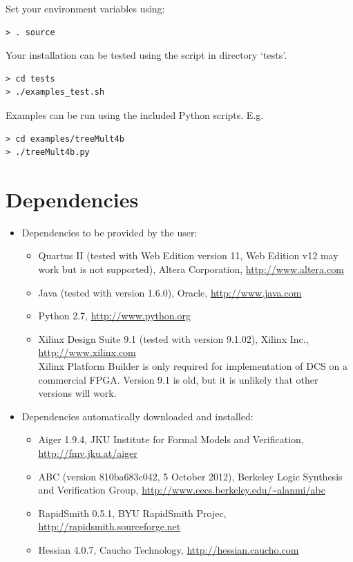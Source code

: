 \documentclass[a4paper,oneside]{memoir}
\begin{document}
Set your environment variables using:
\begin{lstlisting}
> . source
\end{lstlisting}

Your installation can be tested using the script in directory `tests'.
\begin{lstlisting}
> cd tests
> ./examples_test.sh
\end{lstlisting}

Examples can be run using the included Python scripts.
E.g.
\begin{lstlisting}
> cd examples/treeMult4b
> ./treeMult4b.py
\end{lstlisting}

\section{Dependencies}
\begin{itemize}
\item Dependencies to be provided by the user:
\begin{itemize}
\item Quartus II (tested with Web Edition version 11, Web Edition v12 may work but is not supported), Altera Corporation, \url{http://www.altera.com}
\item Java (tested with version 1.6.0), Oracle, \url{http://www.java.com}
\item Python 2.7, \url{http://www.python.org}
\item Xilinx Design Suite 9.1 (tested with version 9.1.02), Xilinx Inc., \url{http://www.xilinx.com}\\
Xilinx Platform Builder is only required for implementation of DCS on a commercial FPGA. Version 9.1 is old, but it is unlikely that other versions will work.
\end{itemize}
\item Dependencies automatically downloaded and installed:
\begin{itemize}
\item Aiger 1.9.4, JKU Institute for Formal Models and Verification, \url{http://fmv.jku.at/aiger}
\item ABC (version 810ba683c042, 5 October 2012), Berkeley Logic Synthesis and Verification Group, \url{http://www.eecs.berkeley.edu/\~alanmi/abc}
\item RapidSmith 0.5.1, BYU RapidSmith Projec,  \url{http://rapidsmith.sourceforge.net}
\item Hessian 4.0.7, Caucho Technology, \url{http://hessian.caucho.com}
\end{itemize}
\end{itemize}
\end{document}
